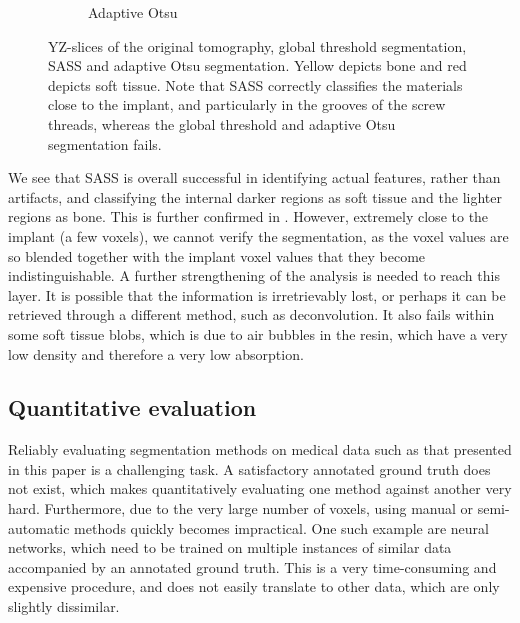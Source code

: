 \begin{figure}
\begin{subfigure}{0.5\textwidth}
      \caption{Adaptive Otsu}
    \end{subfigure}
  \caption{
	  YZ-slices of the original tomography, global threshold segmentation,
	  SASS and adaptive Otsu segmentation. Yellow depicts bone and red
	  depicts soft tissue. Note that SASS correctly classifies the
	  materials close to the implant, and particularly in the grooves of
	  the screw threads, whereas the global threshold and adaptive Otsu
	  segmentation fails.
    }
    \label{fig:histology-comparison2}
\end{figure}

We see that SASS is overall successful in identifying actual features, rather
than artifacts, and classifying the internal darker regions as soft tissue and
the lighter regions as bone. This is further confirmed in
. However, extremely close to the implant (a few
voxels), we cannot verify the segmentation, as the voxel values are so blended
together with the implant voxel values that they become indistinguishable. A
further strengthening of the analysis is needed to reach this layer. It is
possible that the information is irretrievably lost, or perhaps it can be
retrieved through a different method, such as deconvolution.  It also fails
within some soft tissue blobs, which is due to air bubbles in the resin, which
have a very low density and therefore a very low absorption.

\subsection{Quantitative evaluation}

Reliably evaluating segmentation methods on medical data such as that
presented in this paper is a challenging task. A satisfactory annotated ground
truth does not exist, which makes quantitatively evaluating one method against
another very hard. Furthermore, due to the very large number of voxels, using
manual or semi-automatic methods quickly becomes impractical. One such example
are neural networks, which need to be trained on multiple instances of similar
data accompanied by an annotated ground truth. This is a very time-consuming
and expensive procedure, and does not easily translate to other data, which are
only slightly dissimilar.

